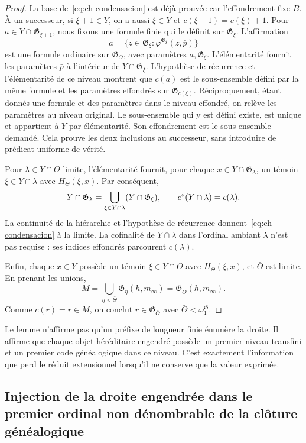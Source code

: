 \begin{proof}
La base de~\eqref{eq:ch-condensacion} est déjà prouvée car l’effondrement fixe \(B\). À un
successeur, si \(\xi+1\in Y\), on a aussi \(\xi\in Y\) et
\(c(\xi+1)=c(\xi)+1\). Pour
\(a\in Y\cap\mathfrak G_{\xi+1}\), nous fixons une formule finie qui le
définit sur \(\mathfrak G_\xi\). L’affirmation
\[
 a=\{z\in\mathfrak G_\xi:
                  \varphi^{\mathfrak G_\xi}(z,\bar p)\}
\]
est une formule ordinaire sur \(\mathfrak G_\Theta\), avec paramètres \(a,\mathfrak G_\xi\). L'élémentarité fournit les paramètres \(\bar p\) à l'intérieur de \(Y\cap\mathfrak G_\xi\). L'hypothèse de récurrence et l'élémentarité de ce niveau montrent que \(c(a)\) est le sous-ensemble défini par la même formule et les paramètres effondrés sur \(\mathfrak G_{c(\xi)}\). Réciproquement, étant donnés une formule et des paramètres dans le niveau effondré, on relève les paramètres au niveau original. Le sous-ensemble qui y est défini existe, est unique et appartient à \(Y\) par élémentarité. Son effondrement est le sous-ensemble demandé. Cela prouve les deux inclusions au successeur, sans introduire de prédicat uniforme de vérité.

Pour \(\lambda\in Y\cap\Theta\) limite, l’élémentarité fournit,
pour chaque \(x\in Y\cap\mathfrak G_\lambda\), un témoin
\(\xi\in Y\cap\lambda\) avec \(H_\Theta(\xi,x)\). Par conséquent,
\[
 Y\cap\mathfrak G_\lambda
 =\bigcup_{\xi\in Y\cap\lambda}(Y\cap\mathfrak G_\xi),
 \qquad c``(Y\cap\lambda)=c(\lambda).
\]
La continuité de la hiérarchie et l’hypothèse de récurrence donnent~\eqref{eq:ch-condensacion} à la
limite. La cofinalité de \(Y\cap\lambda\) dans l’ordinal
ambiant \(\lambda\) n’est pas requise : ses indices effondrés parcourent \(c(\lambda)\).

Enfin, chaque \(x\in Y\) possède un témoin \(\xi\in Y\cap\Theta\)
avec \(H_\Theta(\xi,x)\), et \(\bar\Theta\) est limite. En prenant les unions,
\[
 M=\bigcup_{\eta<\bar\Theta}\mathfrak G_\eta(h,m_\infty)
  =\mathfrak G_{\bar\Theta}(h,m_\infty).
\]
Comme \(c(r)=r\in M\), on conclut
\(r\in\mathfrak G_{\bar\Theta}\) avec
\(\bar\Theta<\omega_1^{\mathfrak G}\).
\end{proof}

Le lemme n'affirme pas qu'un préfixe de longueur finie énumère la droite. Il affirme que chaque objet héréditaire engendré possède un premier niveau transfini et un premier code généalogique dans ce niveau. C'est exactement l'information que perd le réduit extensionnel lorsqu'il ne conserve que la valeur exprimée.

\subsection{Injection de la droite engendrée dans le premier ordinal non dénombrable de la clôture généalogique}

